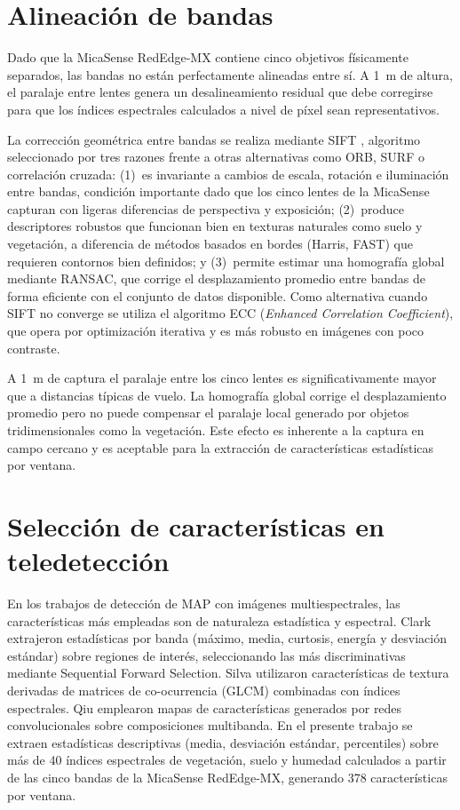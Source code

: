 \section{Alineación de bandas}
\label{sec:alineacion}

Dado que la MicaSense RedEdge-MX contiene cinco objetivos físicamente
separados, las bandas no están perfectamente alineadas entre sí. A
\SI{1}{m} de altura, el paralaje entre lentes genera un desalineamiento
residual que debe corregirse para que los índices espectrales calculados
a nivel de píxel sean representativos.

La corrección geométrica entre bandas se realiza mediante \ac{SIFT}
\cite{sift_lowe2004}, algoritmo seleccionado por tres razones frente a
otras alternativas como ORB, SURF o correlación cruzada:
(1)~es invariante a cambios de escala,
rotación e iluminación entre bandas, condición importante dado que los
cinco lentes de la MicaSense capturan con ligeras diferencias de perspectiva
y exposición; (2)~produce descriptores robustos que funcionan bien en
texturas naturales como suelo y vegetación, a diferencia de métodos basados
en bordes (Harris, FAST) que requieren contornos bien definidos; y
(3)~permite estimar una homografía global mediante RANSAC, que corrige el
desplazamiento promedio entre bandas de forma eficiente con el conjunto de
datos disponible. Como alternativa cuando \ac{SIFT} no converge se utiliza
el algoritmo ECC (\textit{Enhanced Correlation Coefficient}), que opera por
optimización iterativa y es más robusto en imágenes con poco contraste.

A \SI{1}{m} de captura el paralaje entre los cinco lentes es
significativamente mayor que a distancias típicas de vuelo. La homografía
global corrige el desplazamiento promedio pero no puede compensar el
paralaje local generado por objetos tridimensionales como la vegetación.
Este efecto es inherente a la captura en campo cercano y es aceptable para
la extracción de características estadísticas por ventana.

\section{Selección de características en teledetección}

En los trabajos de detección de \ac{MAP} con imágenes multiespectrales,
las características más empleadas son de naturaleza estadística y espectral.
Clark \etal{} \cite{clark2000} extrajeron estadísticas por banda (máximo,
media, curtosis, energía y desviación estándar) sobre regiones de interés,
seleccionando las más discriminativas mediante Sequential Forward Selection.
Silva \etal{} \cite{silva2019} utilizaron características de textura
derivadas de matrices de co-ocurrencia (GLCM) combinadas con índices
espectrales. Qiu \etal{} \cite{qiu2023} emplearon mapas de características
generados por redes convolucionales sobre composiciones multibanda. En el
presente trabajo se extraen estadísticas descriptivas (media,
desviación estándar, percentiles) sobre más de 40 índices espectrales de
vegetación, suelo y humedad calculados a partir de las cinco bandas de la
MicaSense RedEdge-MX, generando 378 características por ventana.

